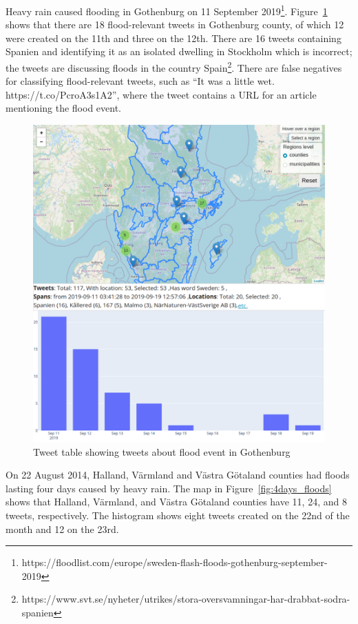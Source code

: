 Heavy rain caused flooding in Gothenburg on 11 September
2019\footnote{https://floodlist.com/europe/sweden-flash-floods-gothenburg-september-2019}.
Figure~\ref{fig:gothenburg_map}
shows that there are 18 flood-relevant tweets in Gothenburg county, of which 12 were created on the
11th and three on the 12th.  There are 16 tweets containing Spanien and identifying it as an
isolated dwelling in Stockholm which is incorrect; the tweets are discussing floods in the country
Spain\footnote{https://www.svt.se/nyheter/utrikes/stora-oversvamningar-har-drabbat-sodra-spanien}. There
are false negatives for classifying flood-relevant tweets, such as ``It was a little
wet. https://t.co/PcroA3s1A2'', where the tweet contains a \ac{URL} for an article mentioning the
flood event.

\begin{figure}[H]
  \begin{center}
    \includegraphics[width=\columnwidth]{./images/gothenburg_floods.png}
  \end{center}
  \caption{Tweet table  showing tweets about flood event in Gothenburg}
  \label{fig:gothenburg_map}
\end{figure}

On 22 August 2014, Halland, Värmland and Västra Götaland counties had floods lasting four days
caused by heavy rain. The map in Figure~\ref{fig:4days_floods} shows that Halland, Värmland, and Västra Götaland counties
have 11, 24, and 8 tweets, respectively. The histogram shows eight tweets created on the 22nd of the
month and 12 on the 23rd.


